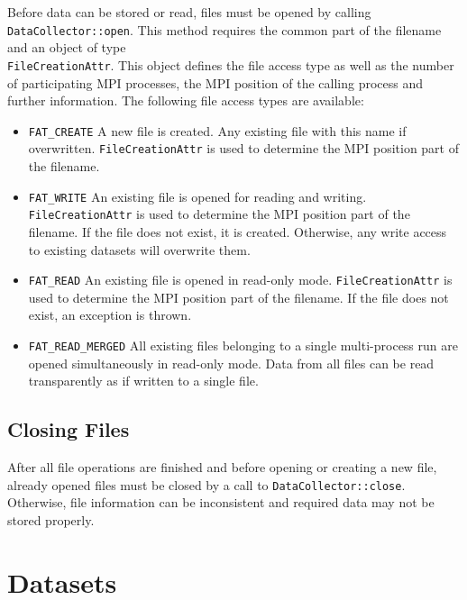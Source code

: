 \documentclass[a4paper,10pt,BCOR12mm]{report}
\newcommand{\code}[1]{\small \texttt{#1}}
\begin{document}
Before data can be stored or read, files must be opened by calling
\code{DataCollector::open}. This method requires the common part of the filename
and an object of type \\\code{FileCreationAttr}.
This object defines the file access type as well as the number of
participating MPI processes, the MPI position of the calling process and further information.
The following file access types are available:
\begin{itemize}
	\item \code{FAT\_CREATE}
	A new file is created. Any existing file with this name if overwritten.
	\code{FileCreationAttr} is used to determine the MPI position part of the filename.

	\item \code{FAT\_WRITE}
	An existing file is opened for reading and writing.
	\code{FileCreationAttr} is used to determine the MPI position part of the filename.
	If the file does not exist, it is created.
	Otherwise, any write access to existing datasets will overwrite them.

	\item \code{FAT\_READ}
	An existing file is opened in read-only mode.
	\code{FileCreationAttr} is used to determine the MPI position part of the filename.
	If the file does not exist, an exception is thrown.

	\item \code{FAT\_READ\_MERGED}
	All existing files belonging to a single multi-process run are opened simultaneously in read-only mode.
	Data from all files can be read transparently as if written to a single file.
\end{itemize}

\subsection{Closing Files}

After all file operations are finished and before opening or creating a new file,
already opened files must be closed by a call to \code{DataCollector::close}.
Otherwise, file information can be inconsistent and required data may not
be stored properly.


\section{Datasets}
\end{document}
